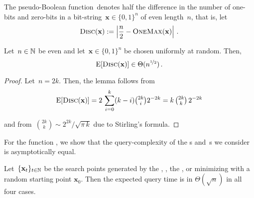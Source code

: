 The pseudo-Boolean function~\discrepancy denotes half the difference in the number of one-bits and zero-bits in a bit-string~$\mathbf{x}\in\{0,1\}^n$ of even length~$n$, that is, let
\begin{equation}
\textsc{Disc}(\mathbf{x}):=\left|\frac{n}{2}-\textsc{OneMax}(\mathbf{x})\right|\,.
\end{equation}


\begin{lemma}\label{lem:discrepancyofX0}
Let~$n\in\mathbb{N}$ be even and let~$\mathbf{x}\in\{0,1\}^n$ be chosen uniformly at random. Then,
\[
\operatorname{E}[\textsc{Disc}(\mathbf{x})]\in\Theta(n^{\nicefrac{1}{2}})\,.
\]
\end{lemma}

\begin{proof}
Let~$n=2k$. Then, the lemma follows from
\[
\operatorname{E}[\textsc{Disc}(\mathbf{x})]=2\,\sum_{i=0}^k(k-i)\tbinom{2k}{i}2^{-2k}=k\,\tbinom{2k}{k}\,2^{-2k}
\]
and from~$\binom{2k}{k}\sim 2^{2k}/\sqrt{\pi\,k}$ due to Stirling's formula.
\end{proof}

For the function \discrepancy, we show that the query-complexity of the \rsh{}s and~\qrsh{}s we consider is asymptotically equal.
\begin{theorem}
%
Let~$\{\mathbf{x}_t\}_{t\in\mathbb{N}}$ be the search points generated by the \ooea, \rls, the \qooea, or \qrls minimizing \discrepancy with a random starting point $\mathbf{x}_0$. Then the expected query time is in $\Theta(\sqrt{n})$ in all four cases.
\end{theorem}

